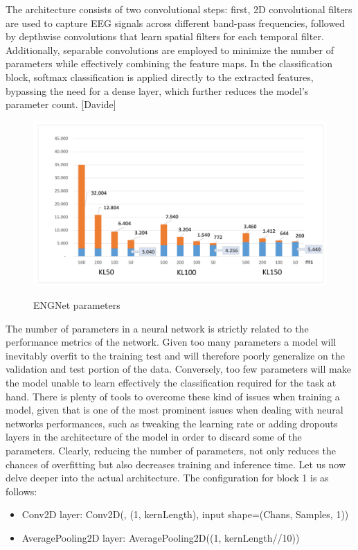 \documentclass{Configuration_Files/PoliMi3i_thesis}
\begin{document}
The architecture consists of two convolutional steps: first, 2D convolutional filters are used to capture EEG signals across different band-pass frequencies, followed by depthwise convolutions that learn spatial filters for each temporal filter. Additionally, separable convolutions are employed to minimize the number of parameters while effectively combining the feature maps. In the classification block, softmax classification is applied directly to the extracted features, bypassing the need for a dense layer, which further reduces the model's parameter count. [Davide]


\begin{figure}[H]
	\includegraphics[scale=0.3]{engNet_params.png}
	\centering
    \label{engNet_params_1}
    \caption{ENGNet parameters}
\end{figure}

The number of parameters in a neural network is strictly related to the performance metrics of the network.
Given too many parameters a model will inevitably overfit to the training test and will therefore poorly generalize on the validation and test portion of the data. Conversely, too few parameters will make the model unable to learn effectively the classification required for the task at hand.
There is plenty of tools to overcome these kind of issues when training a model, given that is one of the most prominent issues when dealing with neural networks performances, such as tweaking the learning rate or adding dropouts layers in the architecture of the model in order to discard some of the parameters.
Clearly, reducing the number of parameters, not only reduces the chances of overfitting but also decreases training and inference time.
Let us now delve deeper into the actual architecture.
The configuration for block 1 is as follows:
\begin{itemize}
\item Conv2D layer: Conv2D(, (1, kernLength), input shape=(Chans, Samples, 1))
\item AveragePooling2D layer: AveragePooling2D((1, kernLength//10))
\end{itemize}
\end{document}
